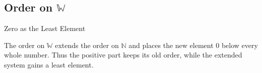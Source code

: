 
\subsection{Order on \texorpdfstring{$\mathbb{W}$}{W}}
\label{sec:order-on-w}
\begin{topicbox}{Zero as the Least Element}
\begin{exposition}
The order on $\mathbb{W}$ extends the order on $\mathbb{N}$ and places the
new element $0$ below every whole number. Thus the positive part keeps its
old order, while the extended system gains a least element.
\end{exposition}
\end{topicbox}
